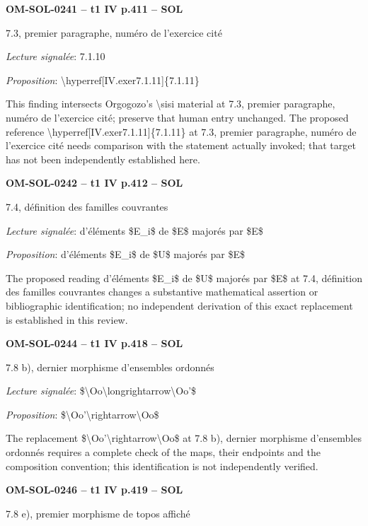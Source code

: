 \par\noindent\textbf{OM-SOL-0241 -- t1 IV p.411 -- SOL}\par
7.3, premier paragraphe, numéro de l'exercice cité\par
\emph{Lecture signalée}: 7.1.10\par
\emph{Proposition}: \textbackslash{}hyperref[IV.exer7.1.11]\{7.1.11\}\par
This finding intersects Orgogozo's \textbackslash{}sisi material at 7.3, premier paragraphe, numéro de l'exercice cité; preserve that human entry unchanged. The proposed reference \textbackslash{}hyperref[IV.exer7.1.11]\{7.1.11\} at 7.3, premier paragraphe, numéro de l'exercice cité needs comparison with the statement actually invoked; that target has not been independently established here.\par
\par\noindent\textbf{OM-SOL-0242 -- t1 IV p.412 -- SOL}\par
7.4, définition des familles couvrantes\par
\emph{Lecture signalée}: d'éléments \$E\_i\$ de \$E\$ majorés par \$E\$\par
\emph{Proposition}: d'éléments \$E\_i\$ de \$U\$ majorés par \$E\$\par
The proposed reading d'éléments \$E\_i\$ de \$U\$ majorés par \$E\$ at 7.4, définition des familles couvrantes changes a substantive mathematical assertion or bibliographic identification; no independent derivation of this exact replacement is established in this review.\par
\par\noindent\textbf{OM-SOL-0244 -- t1 IV p.418 -- SOL}\par
7.8 b), dernier morphisme d'ensembles ordonnés\par
\emph{Lecture signalée}: \$\textbackslash{}Oo\textbackslash{}longrightarrow\textbackslash{}Oo'\$\par
\emph{Proposition}: \$\textbackslash{}Oo'\textbackslash{}rightarrow\textbackslash{}Oo\$\par
The replacement \$\textbackslash{}Oo'\textbackslash{}rightarrow\textbackslash{}Oo\$ at 7.8 b), dernier morphisme d'ensembles ordonnés requires a complete check of the maps, their endpoints and the composition convention; this identification is not independently verified.\par
\par\noindent\textbf{OM-SOL-0246 -- t1 IV p.419 -- SOL}\par
7.8 e), premier morphisme de topos affiché\par
